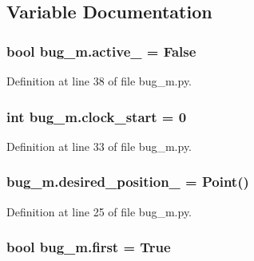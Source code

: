 \subsection{Variable Documentation}
\subsubsection[{\texorpdfstring{active\+\_\+}{active_}}]{\setlength{\rightskip}{0pt plus 5cm}bool bug\+\_\+m.\+active\+\_\+ = False}\hypertarget{namespacebug__m_aac2be257b1acdebfb27dab0e311550d4}{}\label{namespacebug__m_aac2be257b1acdebfb27dab0e311550d4}


Definition at line 38 of file bug\+\_\+m.\+py.

\subsubsection[{\texorpdfstring{clock\+\_\+start}{clock_start}}]{\setlength{\rightskip}{0pt plus 5cm}int bug\+\_\+m.\+clock\+\_\+start = 0}\hypertarget{namespacebug__m_aae90b9eab9f94959ccd1b8e34d6cb837}{}\label{namespacebug__m_aae90b9eab9f94959ccd1b8e34d6cb837}


Definition at line 33 of file bug\+\_\+m.\+py.

\subsubsection[{\texorpdfstring{desired\+\_\+position\+\_\+}{desired_position_}}]{\setlength{\rightskip}{0pt plus 5cm}bug\+\_\+m.\+desired\+\_\+position\+\_\+ = Point()}\hypertarget{namespacebug__m_a8fb60e35f164091fe3355d3a0bce95af}{}\label{namespacebug__m_a8fb60e35f164091fe3355d3a0bce95af}


Definition at line 25 of file bug\+\_\+m.\+py.

\subsubsection[{\texorpdfstring{first}{first}}]{\setlength{\rightskip}{0pt plus 5cm}bool bug\+\_\+m.\+first = True}\hypertarget{namespacebug__m_ae17fcdd9f4bb70982175997ec3b37fdc}{}\label{namespacebug__m_ae17fcdd9f4bb70982175997ec3b37fdc}



